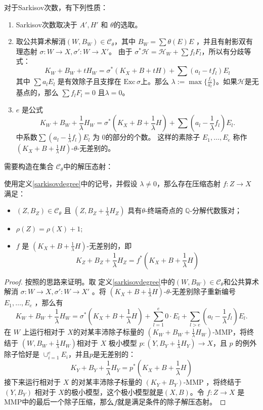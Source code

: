 \begin{remark}
  对于Sarkisov次数，有下列性质：
  \begin{enumerate}
    \item  Sarkisov次数取决于  $A', H'$ 和  $\theta$的选取。
    \item   取公共算术解消$ (W,B_W)\in \mathcal{C}_{\theta} $，其中 $ B_W=\sum \theta(E)E $ ，并且有射影双有理态射 $ \sigma:W\to X , \sigma':W\to X' $。 由于 $\sigma^*\mathcal{H}=\mathcal{H}_W+\sum f_{l}F_{l}$，所以有分歧等式：
          \[ K_W+B_W+tH_W=\sigma^*(K_X+B+tH)+\sum(a_l-tf_l)E_l \]
          其中 $ \sum a_lE_l $ 是有效除子且支撑在 $ \mathrm{Exc}\,\sigma $上。那么 $\lambda:=\max\{ \frac{f_l}{a_l}\}$。如果$ \mathcal{H} $是无基点的，那么 $ \sum f_lF_l=0 $ 且$\lambda=0  $。
    \item   $ e $ 是公式
          \[ K_W+B_W+\frac{1}{\lambda} H_W=\sigma^*(K_X+B+\frac{1}{\lambda} H)+\sum(a_l-\frac{1}{\lambda} f_l)E_l .\]
      中系数$\sum(a_l-\frac{1}{\lambda}f_l)E_l$ 为 $ 0 $的部分的个数。
          这样的素除子 $E_{1},\ldots, E_{e}$ 称作 $(K_{X}+B+\frac{1}{\lambda}H)$-$\theta$-无差别的。
  \end{enumerate}
\end{remark}
需要构造在集合 $\mathcal{C}_{\theta}$中的解压态射：
\begin{lemma}\label{thetaextraction}
  使用定义\ref{sarkisovdegree}中的记号，并假设 $\lambda \neq 0$，那么存在压缩态射  $f: Z\to X$ 满足：
  \begin{itemize}
    \item $(Z,B_{Z})\in \mathcal{C}_{\theta}$ 且 $(Z,B_{Z}+\frac{1}{\lambda}H_{Z})$ 具有$\theta$-终端奇点的 $\mathbb{Q}$-分解代数簇对；
    \item  $\rho(Z)=\rho(X)+1$;
    \item $f$ 是 $(K_{X}+B+\frac{1}{\lambda}H)$-无差别的，即
          \[
            K_{Z}+B_{Z}+\frac{1}{\lambda}H_{Z}=f^*(K_{X}+B+\frac{1}{\lambda}H)
           \]
  \end{itemize}
\end{lemma}
\begin{proof}
  按照\cite[Proposition 1.6]{brunoLogSarkisovProgram1995}的思路来证明。取 定义\ref{sarkisovdegree}中的$ (W,B_{W})\in \mathcal{C}_{\theta}$和公共算术解消  $\sigma:W\to X,\sigma':W \to X'$ 。将 $(K_{X}+B+\frac{1}{\lambda}H)$-$\theta$-无差别除子重新编号 $E_{1},\ldots ,E_{e}$ ，那么有
  \[ K_W+B_W+\frac{1}{\lambda} H_W=\sigma^*(K_X+B+\frac{1}{\lambda} H)+\sum_{l=1}^{e} 0\cdot E_{l}+\sum_{l>e}(a_l-\frac{1}{\lambda} f_l)E_l .\]
  在 $W$ 上运行相对于 $X$的对某丰沛除子标量的  $(K_{W}+B_{W}+\frac{1}{\lambda}H_{W})$-MMP，将终结于 $(W, B_{W}+\frac{1}{\lambda}H_{W})$相对于 $X$ 极小模型 $p:(Y, B_{Y}+\frac{1}{\lambda}H_{Y})\to X$，且 $p$ 的例外除子恰好是 $\cup_{i=1}^{e}E_{i}$，并且$p$是无差别的：
  \[
    K_{Y}+B_{Y}+\frac{1}{\lambda}H_{Y}=p^*(K_{X}+B+\frac{1}{\lambda}H)
    \]
  接下来运行相对于 $X$ 的对某丰沛除子标量的  $(K_{Y}+B_{Y})$-MMP ，将终结于  $(Y,B_{Y})$ 相对于 $X$的极小模型，这个极小模型就是$(X,B)$。令 $f: Z\to X$ 是MMP中的最后一个除子压缩，那么$f$就是满足条件的除子解压态射。
\end{proof}
